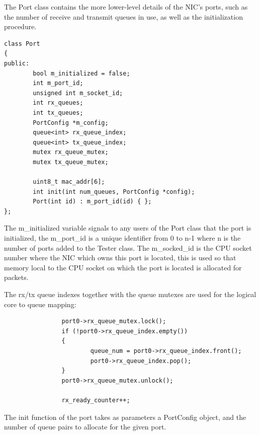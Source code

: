 \documentclass[a4paper,12p]{article}
\begin{document}
The Port class contains the more lower-level details of the NIC’s ports, such as the number of receive and transmit queues in use, as well as the initialization procedure.

\begin{lstlisting}
class Port
{
public:
        bool m_initialized = false;
        int m_port_id;
        unsigned int m_socket_id;
        int rx_queues;
        int tx_queues;
        PortConfig *m_config;
        queue<int> rx_queue_index;
        queue<int> tx_queue_index;
        mutex rx_queue_mutex;
        mutex tx_queue_mutex;

        uint8_t mac_addr[6];
        int init(int num_queues, PortConfig *config);
        Port(int id) : m_port_id(id) { };
};
\end{lstlisting}

The m\_initialized variable signals to any users of the Port class that the port is initialized, the m\_port\_id is a unique identifier from 0 to n-1 where n is the number of ports added to the Tester class. The m\_socked\_id is the CPU socket number where the NIC which owns this port is located, this is used so that memory local to the CPU socket on which the port is located is allocated for packets.

The rx/tx queue indexes together with the queue mutexes are used for the logical core to queue mapping:

\begin{lstlisting}
                port0->rx_queue_mutex.lock();
                if (!port0->rx_queue_index.empty())
                {
                        queue_num = port0->rx_queue_index.front();
                        port0->rx_queue_index.pop();
                }
                port0->rx_queue_mutex.unlock();

                rx_ready_counter++;
\end{lstlisting}

The init function of the port takes as parameters a PortConfig object, and the number of queue pairs to allocate for the given port.
\end{document}
